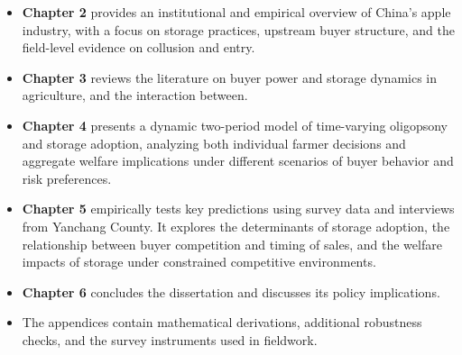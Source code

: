 \begin{itemize}
    \item \textbf{Chapter 2} provides an institutional and empirical overview of China's apple industry, with a focus on storage practices, upstream buyer structure, and the field-level evidence on collusion and entry.

    \item \textbf{Chapter 3} reviews the literature on buyer power and storage dynamics in agriculture, and the interaction between.

    \item \textbf{Chapter 4} presents a dynamic two-period model of time-varying oligopsony and storage adoption, analyzing both individual farmer decisions and aggregate welfare implications under different scenarios of buyer behavior and risk preferences.

    \item \textbf{Chapter 5} empirically tests key predictions using survey data and interviews from Yanchang County. It explores the determinants of storage adoption, the relationship between buyer competition and timing of sales, and the welfare impacts of storage under constrained competitive environments.

    \item \textbf{Chapter 6} concludes the dissertation and discusses its policy implications.

    \item The appendices contain mathematical derivations, additional robustness checks, and the survey instruments used in fieldwork.
\end{itemize}
